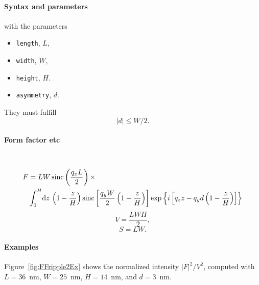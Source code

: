 \FloatBarrier

\paragraph{Syntax and parameters}
\begin{quote}
\end{quote}
with the parameters
\begin{itemize}
\item \texttt{length}, $L$, 
\item \texttt{width}, $W$, 
\item \texttt{height}, $H$. 
\item \texttt{asymmetry}, $d$. 
\end{itemize}
They must fulfill
\begin{displaymath}
  |d| \le W/2.
\end{displaymath}


\paragraph{Form factor etc}\strut\\
\begin{align*}
F &=L W
\operatorname{sinc}\left(\frac{q_xL}{2}\right)\times \\ &
\int_0^H \!\text{d} z\,
\left(1-\frac{z}{H}\right)
 \operatorname{sinc}\left[\frac{q_y
    W}{2}\left(1-\frac{z}{H}\right)\right] 
\exp\left\{ i\left[q_zz -
    q_yd\left(1-\frac{z}{H}\right)\right]\right\}
\end{align*}
\begin{equation*}
  V = \dfrac{L W H}{2},
\end{equation*}
\begin{equation*}
  S = L W.
\end{equation*}

\paragraph{Examples}
Figure~\ref{fig:FFripple2Ex} shows the normalized intensity
$|F|^2/V^2$, computed with $L=36$~nm, $W=25$~nm, $H=14$~nm, and $d=3$~nm.


